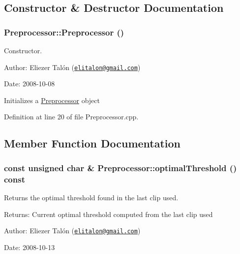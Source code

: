 \subsection{Constructor \& Destructor Documentation}
\hypertarget{class_preprocessor_da966c8b83e7c3bcd8759549c3cdf688}{
\subsubsection[Preprocessor]{\setlength{\rightskip}{0pt plus 5cm}Preprocessor::Preprocessor ()}}
\label{class_preprocessor_da966c8b83e7c3bcd8759549c3cdf688}


Constructor. 

\begin{Desc}
\item[Author:]Eliezer Talón (\href{mailto:elitalon@gmail.com}{\tt elitalon@gmail.com}) \end{Desc}
\begin{Desc}
\item[Date:]2008-10-08\end{Desc}
Initializes a \hyperlink{class_preprocessor}{Preprocessor} object 

Definition at line 20 of file Preprocessor.cpp.

\subsection{Member Function Documentation}
\hypertarget{class_preprocessor_a44dff024a5b29752780bd4aa0d53d81}{
\subsubsection[optimalThreshold]{\setlength{\rightskip}{0pt plus 5cm}const unsigned char \& Preprocessor::optimalThreshold () const}}
\label{class_preprocessor_a44dff024a5b29752780bd4aa0d53d81}


Returns the optimal threshold found in the last clip used. 

\begin{Desc}
\item[Returns:]Current optimal threshold computed from the last clip used\end{Desc}
\begin{Desc}
\item[Author:]Eliezer Talón (\href{mailto:elitalon@gmail.com}{\tt elitalon@gmail.com}) \end{Desc}
\begin{Desc}
\item[Date:]2008-10-13 \end{Desc}


